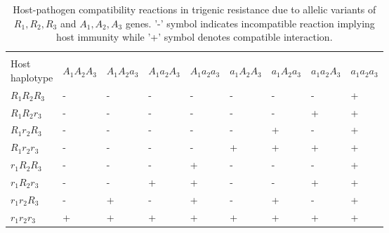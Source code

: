 \documentclass[11pt,dvipsnames,ignorenonframetext,aspectratio=169]{beamer}
\begin{document}
\begin{frame}{}
\begin{columns}[T, onlytextwidth]
\begin{table}
\caption{\label{tab:host-path-compatibility-tri}Host-pathogen compatibility reactions in trigenic resistance due to allelic variants of $R_1, R_2, R_3$ and $A_1, A_2, A_3$ genes. '-' symbol indicates incompatible reaction implying host immunity while '+' symbol denotes compatible interaction.}
\centering
\fontsize{6}{8}\selectfont
\begin{tabular}[t]{>{\raggedright\arraybackslash}p{7.5em}>{\raggedright\arraybackslash}p{2.2em}>{\raggedright\arraybackslash}p{2.2em}>{\raggedright\arraybackslash}p{2.2em}>{\raggedright\arraybackslash}p{2.2em}>{\raggedright\arraybackslash}p{2.2em}>{\raggedright\arraybackslash}p{2.2em}>{\raggedright\arraybackslash}p{2.2em}>{\raggedright\arraybackslash}p{2.2em}}
\toprule
\multicolumn{1}{c}{ } & \multicolumn{8}{c}{Pathogen genotype} \\
\cmidrule(l{3pt}r{3pt}){2-9}
Host haplotype & $A_1 A_2 A_3$ & $A_1 A_2 a_3$ & $A_1 a_2 A_3$ & $A_1 a_2 a_3$ & $a_1 A_2 A_3$ & $a_1 A_2 a_3$ & $a_1 a_2 A_3$ & $a_1 a_2 a_3$\\
\midrule
$R_1 R_2 R_3$ & - & - & - & - & - & - & - & +\\
$R_1 R_2 r_3$ & - & - & - & - & - & - & + & +\\
$R_1 r_2 R_3$ & - & - & - & - & - & + & - & +\\
$R_1 r_2 r_3$ & - & - & - & - & + & + & + & +\\
$r_1 R_2 R_3$ & - & - & - & + & - & - & - & +\\
\addlinespace
$r_1 R_2 r_3$ & - & - & + & + & - & - & + & +\\
$r_1 r_2 R_3$ & - & + & - & + & - & + & - & +\\
$r_1 r_2 r_3$ & + & + & + & + & + & + & + & +\\
\bottomrule
\end{tabular}
\end{table}

\end{columns}
\end{frame}
\end{document}
